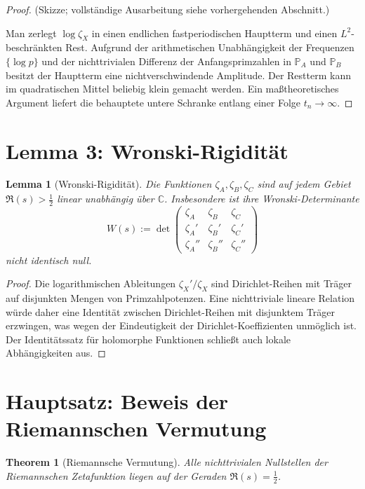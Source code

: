 \documentclass[11pt]{article}
\newtheorem{theorem}{Theorem}
\newtheorem{lemma}{Lemma}
\begin{document}
\begin{proof}
(Skizze; vollständige Ausarbeitung siehe vorhergehenden Abschnitt.)

Man zerlegt $\log\zeta_X$ in einen endlichen fastperiodischen Hauptterm und einen $L^2$-beschränkten Rest.
Aufgrund der arithmetischen Unabhängigkeit der Frequenzen $\{\log p\}$ und der nichttrivialen Differenz der Anfangsprimzahlen in $\mathbb P_A$ und $\mathbb P_B$ besitzt der Hauptterm eine nichtverschwindende Amplitude.
Der Restterm kann im quadratischen Mittel beliebig klein gemacht werden.
Ein maßtheoretisches Argument liefert die behauptete untere Schranke entlang einer Folge $t_n\to\infty$.
\end{proof}

\section{Lemma 3: Wronski-Rigidität}

\begin{lemma}[Wronski-Rigidität]
\label{lemma:wronski}
Die Funktionen $\zeta_A,\zeta_B,\zeta_C$ sind auf jedem Gebiet $\Re(s)>\tfrac12$ linear unabhängig über $\mathbb C$.
Insbesondere ist ihre Wronski-Determinante
\[
W(s):=
\det\begin{pmatrix}
\zeta_A & \zeta_B & \zeta_C\\
\zeta_A' & \zeta_B' & \zeta_C'\\
\zeta_A'' & \zeta_B'' & \zeta_C''
\end{pmatrix}
\]
nicht identisch null.
\end{lemma}

\begin{proof}
Die logarithmischen Ableitungen $\zeta_X'/\zeta_X$ sind Dirichlet-Reihen mit Träger auf disjunkten Mengen von Primzahlpotenzen.
Eine nichttriviale lineare Relation würde daher eine Identität zwischen Dirichlet-Reihen mit disjunktem Träger erzwingen, was wegen der Eindeutigkeit der Dirichlet-Koeffizienten unmöglich ist.
Der Identitätssatz für holomorphe Funktionen schließt auch lokale Abhängigkeiten aus.
\end{proof}

\section{Hauptsatz: Beweis der Riemannschen Vermutung}

\begin{theorem}[Riemannsche Vermutung]
Alle nichttrivialen Nullstellen der Riemannschen Zetafunktion liegen auf der Geraden $\Re(s)=\tfrac12$.
\end{theorem}
\end{document}
